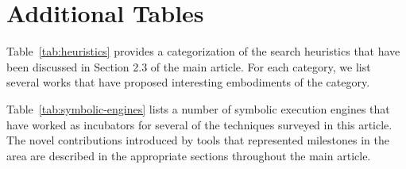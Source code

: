 \section{Additional Tables}

Table~\ref{tab:heuristics} provides a categorization of the search heuristics that have been discussed in Section 2.3 of the main article. For each category, we list several works that have proposed interesting embodiments of the category.

Table~\ref{tab:symbolic-engines} lists a number of symbolic execution engines that have worked as incubators for several of the techniques surveyed in this article. The novel contributions introduced by tools that represented milestones in the area are described in the appropriate sections throughout the main article.

